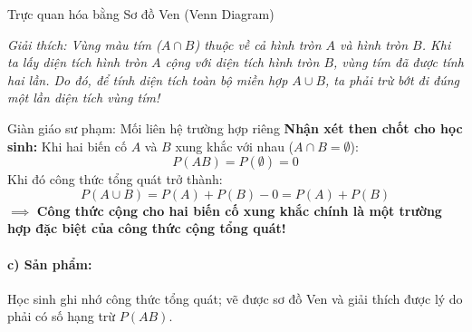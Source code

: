 \documentclass[12pt, a4paper]{article}
\begin{document}
\begin{pedabox}{Trực quan hóa bằng Sơ đồ Ven (Venn Diagram)}
\begin{center}
\end{center}
\textit{Giải thích: Vùng màu tím ($A \cap B$) thuộc về cả hình tròn $A$ và hình tròn $B$. Khi ta lấy diện tích hình tròn $A$ cộng với diện tích hình tròn $B$, vùng tím đã được tính hai lần. Do đó, để tính diện tích toàn bộ miền hợp $A \cup B$, ta phải trừ bớt đi đúng một lần diện tích vùng tím!}
\end{pedabox}

\begin{scaffoldbox}{Giàn giáo sư phạm: Mối liên hệ trường hợp riêng}
\textbf{Nhận xét then chốt cho học sinh:}
Khi hai biến cố $A$ và $B$ xung khắc với nhau ($A \cap B = \emptyset$):
$$P(AB) = P(\emptyset) = 0$$
Khi đó công thức tổng quát trở thành:
$$P(A \cup B) = P(A) + P(B) - 0 = P(A) + P(B)$$
$\implies$ \textbf{Công thức cộng cho hai biến cố xung khắc chính là một trường hợp đặc biệt của công thức cộng tổng quát!}
\end{scaffoldbox}

\paragraph{c) Sản phẩm:} Học sinh ghi nhớ công thức tổng quát; vẽ được sơ đồ Ven và giải thích được lý do phải có số hạng trừ $P(AB)$.
\end{document}
